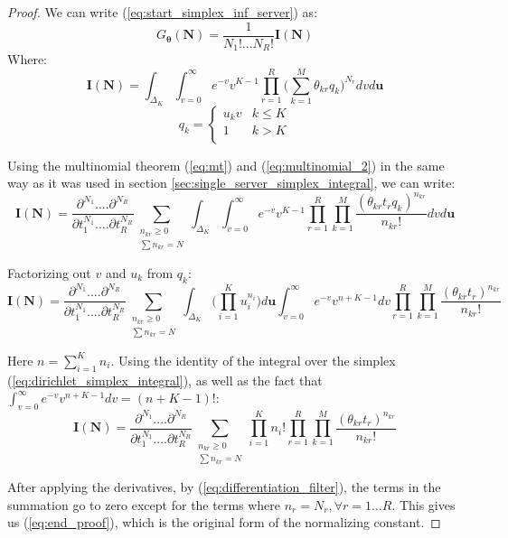 \begin{proof}
    We can write (\ref{eq:start_simplex_inf_server}) as:
    \begin{equation}
        G_{\boldsymbol{\theta}}(\mathbf{N}) = \frac{1}{N_1! ... N_R!} \mathbf{I(N)}
    \end{equation}
    Where:
    \begin{equation}
        \mathbf{I(N)} = \int_{\Delta_K} \int_{v=0}^{\infty} e^{-v} v^{K-1} \prod_{r=1}^R \bigg( \sum_{k=1}^M \theta_{kr} q_k \bigg)^{N_r} dv d\mathbf{u} 
    \end{equation}
    \[q_k = 
    \begin{cases}
        u_k v & k \leq K\\
        1 & k > K\\
    \end{cases}\]
    
    Using the multinomial theorem (\ref{eq:mt}) and (\ref{eq:multinomial_2}) in the same way as it was used in section \ref{sec:single_server_simplex_integral}, we can write:
    \begin{equation}
        \mathbf{I(N)} = \frac{\partial^{N_1}....\partial^{N_R}}{\partial t_1^{N_1}....\partial t_R^{N_R}} \sum_{\substack{n_{kr} \geq 0 \\ \sum n_{kr} = N}} \int_{\Delta_K} \int_{v=0}^{\infty} e^{-v} v^{K-1} \prod_{r=1}^R \prod_{k=1}^M \frac{(\theta_{kr} t_r q_k)^{n_{kr}}}{n_{kr}!}  dv d\mathbf{u} 
    \end{equation}
    
    Factorizing out \(v\) and \(u_k\) from \(q_k\):
    \begin{equation}
        \mathbf{I(N)} = \frac{\partial^{N_1}....\partial^{N_R}}{\partial t_1^{N_1}....\partial t_R^{N_R}} \sum_{\substack{n_{kr} \geq 0 \\ \sum n_{kr} = N}}  \int_{\Delta_K} \bigg( \prod_{i=1}^K u_i^{n_i} \bigg) d\mathbf{u} \int_{v=0}^{\infty} e^{-v} v^{n +K-1} dv \prod_{r=1}^R \prod_{k=1}^M \frac{(\theta_{kr} t_r)^{n_{kr}}}{n_{kr}!}  
    \end{equation}
    
    Here \(n = \sum_{i=1}^K n_i\). Using the identity of the integral over the simplex (\ref{eq:dirichlet_simplex_integral}), as well as the fact that \(\int_{v=0}^{\infty} e^{-v} v^{n +K-1} dv = (n+K-1)!\):
    \begin{equation}
        \mathbf{I(N)} = \frac{\partial^{N_1}....\partial^{N_R}}{\partial t_1^{N_1}....\partial t_R^{N_R}} \sum_{\substack{n_{kr} \geq 0 \\ \sum n_{kr} = N}}  \prod_{i=1}^K n_i!  \prod_{r=1}^R \prod_{k=1}^M \frac{(\theta_{kr} t_r)^{n_{kr}}}{n_{kr}!}  
    \end{equation}
    
    After applying the derivatives, by (\ref{eq:differentiation_filter}), the terms in the summation go to zero except for the terms where \(n_r=N_r, \forall r=1...R\). This gives us (\ref{eq:end_proof}), which is the original form of the normalizing constant.
\end{proof}

